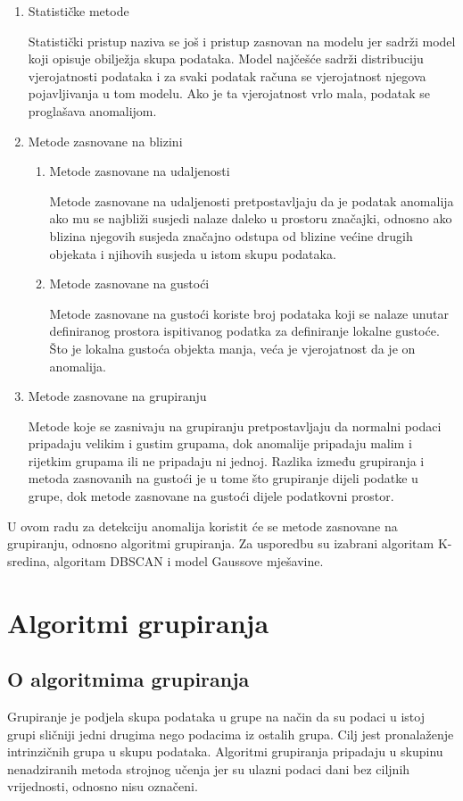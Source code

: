 \documentclass[utf8, diplomski, numeric]{fer}
\begin{document}
\begin{enumerate}
\item Statističke metode

Statistički pristup naziva se još i pristup zasnovan na modelu jer sadrži model koji opisuje obilježja skupa podataka. Model najčešće sadrži distribuciju vjerojatnosti podataka i za svaki podatak računa se vjerojatnost njegova pojavljivanja u tom modelu. Ako je ta vjerojatnost vrlo mala, podatak se proglašava anomalijom.
\item Metode zasnovane na blizini

\begin{enumerate}
\item Metode zasnovane na udaljenosti

Metode zasnovane na udaljenosti pretpostavljaju da je podatak anomalija ako mu se najbliži susjedi nalaze daleko u prostoru značajki, odnosno ako blizina njegovih susjeda značajno odstupa od blizine većine drugih objekata i njihovih susjeda u istom skupu podataka.
\item Metode zasnovane na gustoći

Metode zasnovane na gustoći koriste broj podataka koji se nalaze unutar definiranog prostora ispitivanog podatka za definiranje lokalne gustoće. Što je lokalna gustoća objekta manja, veća je vjerojatnost da je on anomalija.
\end{enumerate}
\item Metode zasnovane na grupiranju

Metode koje se zasnivaju na grupiranju pretpostavljaju da normalni podaci pripadaju velikim i gustim grupama, dok anomalije pripadaju malim i rijetkim grupama ili ne pripadaju ni jednoj. Razlika između grupiranja i metoda zasnovanih na gustoći je u tome što grupiranje dijeli podatke u grupe, dok metode zasnovane na gustoći dijele podatkovni prostor.
\end{enumerate}
U ovom radu za detekciju anomalija koristit će se metode zasnovane na grupiranju, odnosno algoritmi grupiranja. Za usporedbu su izabrani algoritam K-sredina, algoritam DBSCAN i model Gaussove mješavine.


\chapter{Algoritmi grupiranja} \label{ch:third}
\section{O algoritmima grupiranja}
Grupiranje je podjela skupa podataka u grupe na način da su podaci u istoj grupi sličniji jedni drugima nego podacima iz ostalih grupa. Cilj jest pronalaženje intrinzičnih grupa u skupu podataka. Algoritmi grupiranja pripadaju u skupinu nenadziranih metoda strojnog učenja jer su ulazni podaci dani bez ciljnih vrijednosti, odnosno nisu označeni. 
\end{document}
